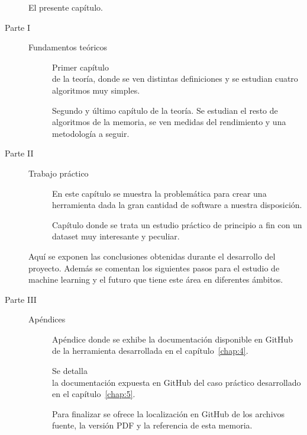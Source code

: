 \begin{description}
\item[] El presente capítulo.

\large
\item[Parte I] Fundamentos teóricos
\normalsize

\begin{description}
\item[] Primer capítulo \\ de la teoría, donde se ven distintas definiciones y se estudian cuatro algoritmos muy simples.

\item[] Segundo y último capítulo de la teoría. Se estudian el resto de algoritmos de la memoria, se ven medidas del rendimiento y una metodología a seguir.
\end{description}

\large
\item[Parte II] Trabajo práctico
\normalsize

\begin{description}
\item[] En este capítulo se muestra la problemática para crear una herramienta dada la gran cantidad de software a nuestra disposición.

\item[] Capítulo donde se trata un estudio práctico de principio a fin con un dataset muy interesante y peculiar.
\end{description}

\item[] Aquí se exponen las conclusiones obtenidas durante el desarrollo del proyecto. Además se comentan los siguientes pasos para el estudio de machine learning y el futuro que tiene este área en diferentes ámbitos.

\pagebreak

\large
\item[Parte III] Apéndices
\normalsize

\begin{description}
\item[] Apéndice donde se exhibe la documentación disponible en GitHub de la herramienta desarrollada en el capítulo~\ref{chap:4}.

\item[] Se detalla \\ la documentación expuesta en GitHub del caso práctico desarrollado en el capítulo~\ref{chap:5}.

\item[] Para finalizar se ofrece la localización en GitHub de los archivos fuente, la versión PDF y la referencia de esta memoria.
\end{description}
\end{description}
